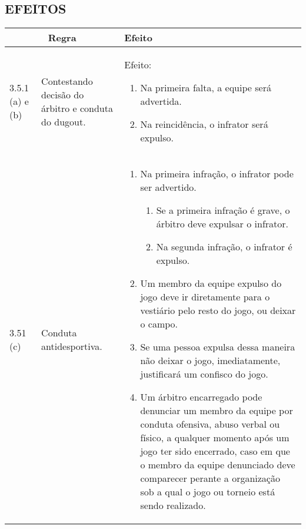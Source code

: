 \subsection*{EFEITOS}

{\footnotesize
	\begin{tabular}{p{}p{}|p{}}
		\multicolumn{2}{c|}{Regra} & Efeito \\\hline\hline 
		
		3.5.1 (a) e (b) & Contestando decis\~ao do \'arbitro e conduta do \Gls{dugout}. &
		Efeito: 
		
		\begin{enumerate}[label=\alph*)]
			\item Na primeira falta, a equipe ser\'a advertida. 
			
			\item  Na reincid\^encia, o infrator ser\'a expulso. 
		\end{enumerate}
		\\\hline
		3.51 (c) & Conduta antidesportiva. &
		
		\begin{enumerate}[label=\alph*)]
			\item Na primeira infra\c{c}\~ao, o infrator pode ser advertido. 
			\begin{enumerate}[label=\roman* -]
				\item Se a primeira infra\c{c}\~ao \'e grave, o \'arbitro deve expulsar o infrator. 
				\item Na segunda infra\c{c}\~ao, o infrator \'e expulso. 
			\end{enumerate}
			\item  Um membro da equipe expulso do jogo deve ir diretamente para o vesti\'ario pelo 
			resto do jogo, ou deixar o campo. 
			
			\item  Se uma pessoa expulsa dessa maneira n\~ao deixar o jogo, imediatamente, justificar\'a 
			um confisco do jogo. 
			
			\item  Um \'arbitro encarregado pode denunciar um membro da equipe por conduta ofensiva, abuso verbal ou f\'isico, a qualquer momento ap\'os um jogo ter sido encerrado, caso em que o membro da equipe denunciado deve comparecer perante a organiza\c{c}\~ao sob a qual o jogo ou torneio est\'a sendo realizado.
		\end{enumerate}
\end{tabular}}
